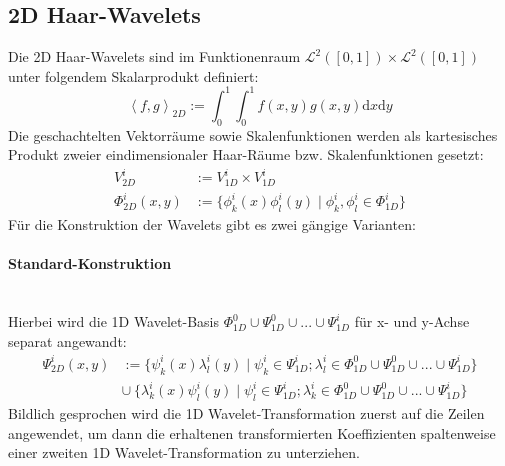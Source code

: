 \subsection{2D Haar-Wavelets}
Die 2D Haar-Wavelets sind im Funktionenraum $\mathcal{L}^2([0,1])\times\mathcal{L}^2([0,1])$ unter folgendem Skalarprodukt definiert:\begin{equation*}
	\left\langle f, g\right\rangle _{2D}:=\int_{0}^{1}\int_{0}^{1}f(x,y)g(x,y)\mathrm{d}x\mathrm{d}y
\end{equation*}
Die geschachtelten Vektorräume sowie Skalenfunktionen werden als kartesisches Produkt zweier eindimensionaler Haar-Räume bzw. Skalenfunktionen gesetzt:\begin{align*}
	V^i_{2D}&:= V^i_{1D}\times V^i_{1D}\\
	\Phi^i_{2D}(x, y)&:=\{\phi^i_k(x)\phi^i_l(y)\mid \phi^i_k, \phi^i_l\in\Phi^i_{1D} \}
\end{align*}
Für die Konstruktion der Wavelets gibt es zwei gängige Varianten:
\paragraph{Standard-Konstruktion}~\\
Hierbei wird die 1D Wavelet-Basis $\Phi_{1D}^0\cup\Psi_{1D}^0\cup...\cup\Psi_{1D}^{i}$ für x- und y-Achse separat angewandt:\begin{align*}
	\Psi^i_{2D}(x, y)&:=\{\psi^i_k(x)\lambda^i_l(y)\mid \psi^i_k\in\Psi_{1D}^{i};\lambda^i_l\in\Phi_{1D}^0\cup\Psi_{1D}^0\cup...\cup\Psi_{1D}^{i} \}\\
	&\cup\ \{\lambda^i_k(x)\psi^i_l(y)\mid \psi^i_l\in\Psi_{1D}^{i};\lambda^i_k\in\Phi_{1D}^0\cup\Psi_{1D}^0\cup...\cup\Psi_{1D}^{i} \}
\end{align*}Bildlich gesprochen wird die 1D Wavelet-Transformation zuerst auf die Zeilen angewendet, um dann die erhaltenen transformierten Koeffizienten spaltenweise einer zweiten 1D Wavelet-Transformation zu unterziehen.
